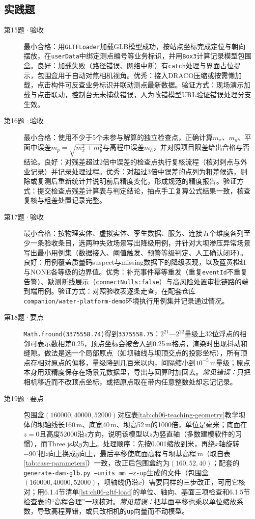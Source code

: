 \subsection*{实践题}
\begin{description}
  \item[第15题·验收] 最小合格：用\texttt{GLTFLoader}加载GLB模型成功，按站点坐标完成定位与朝向摆放，在\texttt{userData}中绑定测点编号等业务标识，并用\texttt{Box3}计算记录模型包围盒。良好：加载失败（路径错误、网络中断）有\texttt{catch}处理与界面占位提示，包围盒用于自动对焦相机视角。优秀：接入DRACO压缩或按需懒加载，点击构件可反查业务标识并联动测点最新数据。验证方式：现场演示加载与点击联动，控制台无未捕获错误，人为改错模型URL验证错误处理分支生效。
  \item[第16题·验收] 最小合格：使用不少于5个未参与解算的独立检查点，正确计算$m_x$、$m_y$、平面中误差$m_p=\sqrt{m_x^2+m_y^2}$与高程中误差$m_h$，并对照项目限差给出合格与否结论。良好：对残差超过2倍中误差的检查点执行复核流程（核对刺点与外业记录）并记录处理过程。优秀：对超过3倍中误差的点列为粗差候选，剔除或复测后重新统计并说明前后精度变化，形成规范的精度报告。验证方式：提交检查点残差计算表与判定结论，抽点手工复算公式结果一致，核查复核与粗差处置记录完整。
  \item[第17题·验收] 最小合格：按物理实体、虚拟实体、孪生数据、服务、连接五个维度各列至少一条验收条目，选两种失效场景写出降级用例，并针对大坝渗压异常场景写出最小用例集（数据接入、阈值触发、预警等级判定、人工确认闭环）。良好：用例覆盖质量码suspect与missing数据下的降级表现，以及蓝黄橙红与NONE各等级的边界值。优秀：补充事件幂等重发（重复\texttt{eventId}不重复告警）、缺测断线展示（\texttt{connectNulls:false}）与高风险处置审批链路的端到端用例。验证方式：对照验收表逐条走查，在配套仓库\texttt{companion/water-platform-demo}环境执行用例集并记录通过情况。
  \item[第18题·要点] \texttt{Math.fround(3375558.74)}得到\texttt{3375558.75}：$2^{21}$—$2^{22}$量级上32位浮点的相邻可表示数相差0.25，顶点坐标会被舍入到0.25\,m格点，渲染时出现抖动和缝隙。做法是选一个局部原点（如坝轴线与坝顶交点的投影坐标），所有顶点存相对原点的偏移，量级降到几百米以内，间隔缩小到$10^{-5}$\,m量级；原点本身用双精度保存在场景元数据里，导出与回算时加回去。\textit{常见错误：}只把相机移近而不改顶点坐标，或把原点取在带内任意整数处却忘记记录。
  \item[第19题·要点] 包围盒$(160000,40000,52000)$对应表\ref{tab:ch06-teaching-geometry}教学坝体的坝轴线长160\,m、底宽40\,m、坝高52\,m的1000倍，单位是毫米；底面在$z=0$且高度52000沿$z$方向，说明该模型以$z$为竖直轴（多数建模软件的习惯），而Three.js以$y$为上。处理顺序：先按0.001缩放到米，再绕$x$轴旋转$-90^\circ$把$z$向上换成$y$向上，最后平移使底面高程与坝基高程\cpBaseElev\,m（取自表\ref{tab:case-parameters}）一致，改正后包围盒约为$(160,52,40)$；配套的\texttt{generate-dam-glb.py --units mm --z-up}生成的文件（包围盒$(160000,40000,52000)$，坝轴线仍沿$x$）需要同样的三步改正，可用它核对；用6.1.4节清单\ref{lst:ch06-gltf-load}的单位、轴向、基面三项检查和6.1.5节检查表的“高程合理”一项核对。\textit{常见错误：}把基面平移也乘以单位缩放系数，导致高程算错，或只改相机的\texttt{up}向量而不动模型。
\end{description}
